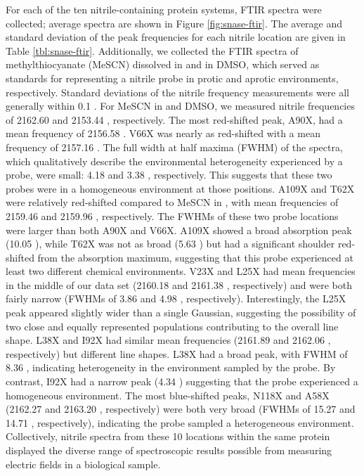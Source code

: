 For each of the ten nitrile-containing protein systems, FTIR spectra were collected; 
average spectra are shown in Figure \ref{fig:snase-ftir}. 
The average and standard deviation of the peak frequencies for each nitrile location are given in Table \ref{tbl:snase-ftir}. 
Additionally, we collected the FTIR spectra of methylthiocyanate (MeSCN) dissolved in  and in DMSO, which served as standards for representing a nitrile probe in protic and aprotic environments, respectively. 
Standard deviations of the nitrile frequency measurements were all generally within 0.1 \si{\wn}. 
For MeSCN in  and DMSO, we measured nitrile frequencies of 2162.60 and 2153.44 \si{\wn}, respectively. 
The most red-shifted peak, A90X, had a mean frequency of 2156.58 \si{\wn}. 
V66X was nearly as red-shifted with a mean frequency of 2157.16 \si{\wn}. 
The full width at half maxima (FWHM) of the spectra, which qualitatively describe the environmental heterogeneity experienced by a probe, were small: 4.18 \si{\wn} and 3.38 \si{\wn}, respectively. 
This suggests that these two probes were in a homogeneous environment at those positions. 
A109X and T62X were relatively red-shifted compared to MeSCN in , with mean frequencies of 2159.46 \si{\wn} and 2159.96 \si{\wn}, respectively. 
The FWHMs of these two probe locations were larger than both A90X and V66X. 
A109X showed a broad absorption peak (10.05 \si{\wn}), while T62X was not as broad (5.63 \si{\wn}) but had a significant shoulder red-shifted from the absorption maximum, suggesting that this probe experienced at least two different chemical environments. 
V23X and L25X had mean frequencies in the middle of our data set (2160.18 \si{\wn} and 2161.38 \si{\wn}, respectively) and were both fairly narrow (FWHMs of 3.86 \si{\wn} and 4.98 \si{\wn}, respectively). 
Interestingly, the L25X peak appeared slightly wider than a single Gaussian, suggesting the possibility of two close and equally represented populations contributing to the overall line shape. 
L38X and I92X had similar mean frequencies (2161.89 \si{\wn} and 2162.06 \si{\wn}, respectively) but different line shapes. 
L38X had a broad peak, with FWHM of 8.36 \si{\wn}, indicating heterogeneity in the environment sampled by the probe. 
By contrast, I92X had a narrow peak (4.34 \si{\wn}) suggesting that the probe experienced a homogeneous environment. 
The most blue-shifted peaks, N118X and A58X (2162.27 \si{\wn} and 2163.20 \si{\wn}, respectively) were both very broad (FWHMs of 15.27 \si{\wn} and 14.71 \si{\wn}, respectively), indicating the probe sampled a heterogeneous environment. 
Collectively, nitrile spectra from these 10 locations within the same protein displayed the diverse range of spectroscopic results possible from measuring electric fields in a biological sample. 

